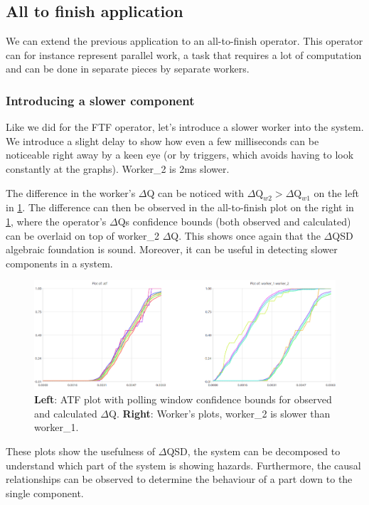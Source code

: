\subsection{All to finish application}
    We can extend the previous application to an all-to-finish operator. This operator can for instance represent parallel work, a task that requires a lot of computation and can be done in separate pieces by separate workers. \cite{dq-tut}

        \subsubsection{Introducing a slower component}
            Like we did for the FTF operator, let's introduce a slower worker into the system. We introduce a slight delay to show how even a few milliseconds can be noticeable right away by a keen eye (or by triggers, which avoids having to look constantly at the graphs). Worker\_2 is 2ms slower.
 
            The difference in the worker's $\Delta$Q can be noticed with $\Delta \text{Q}_{w2} > \Delta \text{Q}_{w1}$ on the left in \cref{fig:slower_atf}. The difference can then be observed in the all-to-finish plot on the right in \cref{fig:slower_atf}, where the operator's $\Delta$Qs confidence bounds (both observed and calculated) can be overlaid on top of worker\_2 $\Delta$Q. This shows once again that the $\Delta$QSD algebraic foundation is sound. Moreover, it can be useful in detecting slower components in a system.

            \begin{figure}[H]
                \begin{center}
                    \includegraphics[scale = 0.5]{img/overload_2/w1w2atf.png}
                \end{center}
                \caption{\textbf{Left}: ATF plot with polling window confidence bounds for observed and calculated $\Delta$Q. \textbf{Right}: Worker's plots, worker\_2 is slower than worker\_1.}
                \label{fig:slower_atf}
            \end{figure}

    These plots show the usefulness of $\Delta$QSD, the system can be decomposed to understand which part of the system is showing hazards. Furthermore, the causal relationships can be observed to determine the behaviour of a part down to the single component.
